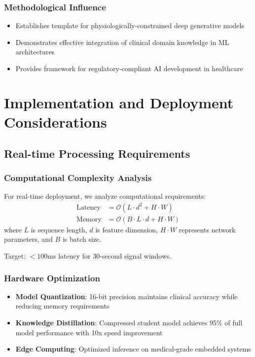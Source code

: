 \documentclass[11pt]{article}
\begin{document}
\subsubsection{Methodological Influence}
\begin{itemize}
    \item Establishes template for physiologically-constrained deep generative models
    \item Demonstrates effective integration of clinical domain knowledge in ML architectures
    \item Provides framework for regulatory-compliant AI development in healthcare
\end{itemize}

\section{Implementation and Deployment Considerations}
\label{sec:implementation}

\subsection{Real-time Processing Requirements}

\subsubsection{Computational Complexity Analysis}
For real-time deployment, we analyze computational requirements:
\begin{align}
\text{Latency} &= \mathcal{O}(L \cdot d^2 + H \cdot W) \\
\text{Memory} &= \mathcal{O}(B \cdot L \cdot d + H \cdot W)
\end{align}
where $L$ is sequence length, $d$ is feature dimension, $H \cdot W$ represents network parameters, and $B$ is batch size.

Target: $< 100$ms latency for 30-second signal windows.

\subsubsection{Hardware Optimization}
\begin{itemize}
    \item \textbf{Model Quantization}: 16-bit precision maintains clinical accuracy while reducing memory requirements
    \item \textbf{Knowledge Distillation}: Compressed student model achieves 95\% of full model performance with 10x speed improvement
    \item \textbf{Edge Computing}: Optimized inference on medical-grade embedded systems
\end{itemize}
\end{document}

